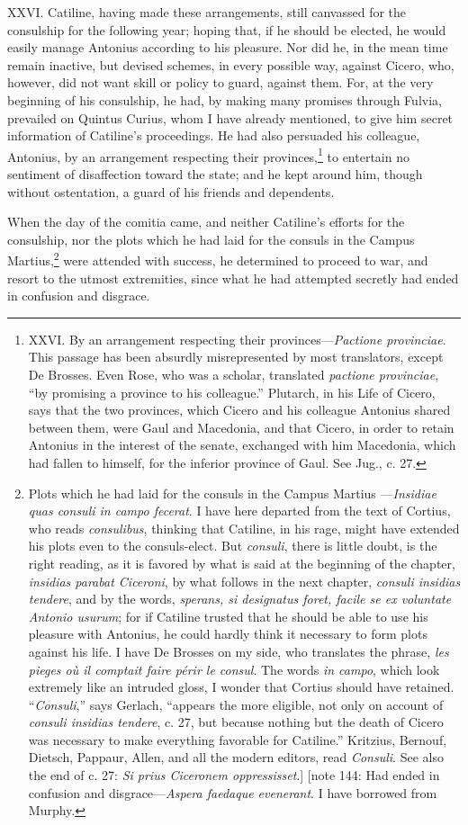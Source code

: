 XXVI. Catiline, having made these arrangements, still canvassed for
the consulship for the following year; hoping that, if he should be
elected, he would easily manage Antonius according to his pleasure.
Nor did he, in the mean time remain inactive, but devised schemes, in
every possible way, against Cicero, who, however, did not want skill
or policy to guard, against them. For, at the very beginning of his
consulship, he had, by making many promises through Fulvia, prevailed
on Quintus Curius, whom I have already mentioned, to give him secret
information of Catiline's proceedings. He had also persuaded his
colleague, Antonius, by an arrangement respecting their provinces,\footnote{XXVI. By an arrangement respecting their provinces—\emph{Pactione
provinciae}. This passage has been absurdly misrepresented by most
translators, except De Brosses. Even Rose, who was a scholar, translated
\emph{pactione provinciae}, ``by promising a province to his colleague.''
Plutarch, in his Life of Cicero, says that the two provinces, which
Cicero and his colleague Antonius shared between them, were Gaul and
Macedonia, and that Cicero, in order to retain Antonius in the interest
of the senate, exchanged with him Macedonia, which had fallen to himself,
for the inferior province of Gaul. See Jug., c. 27.}
to entertain no sentiment of disaffection toward the state; and he kept
around him, though without ostentation, a guard of his friends and
dependents.

When the day of the comitia came, and neither Catiline's efforts for
the consulship, nor the plots which he had laid for the consuls in the
Campus Martius,\footnote{Plots which he had laid for the consuls in the Campus Martius
—\emph{Insidiae quas consuli in campo fecerat}. I have here departed from
the text of Cortius, who reads \emph{consulibus}, thinking that Catiline, in
his rage, might have extended his plots even to the consuls-elect. But
\emph{consuli}, there is little doubt, is the right reading, as it is favored
by what is said at the beginning of the chapter, \emph{insidias parabat
Ciceroni}, by what follows in the next chapter, \emph{consuli insidias tendere},
and by the words, \emph{sperans, si designatus foret, facile se ex voluntate
Antonio usurum}; for if Catiline trusted that he should be able to use
his pleasure with Antonius, he could hardly think it necessary to form
plots against his life. I have De Brosses on my side, who translates the
phrase, \emph{les pieges où il comptait faire périr le consul}. The words \emph{in
campo}, which look extremely like an intruded gloss, I wonder that
Cortius should have retained. ``\emph{Consuli},'' says Gerlach, ``appears the
more eligible, not only on account of \emph{consuli insidias tendere}, c. 27,
but because nothing but the death of Cicero was necessary to make
everything favorable for Catiline.'' Kritzius, Bernouf, Dietsch, Pappaur,
Allen, and all the modern editors, read \emph{Consuli}. See also the end of
c. 27: \emph{Si prius Ciceronem oppressisset}.] [note 144: Had ended in
confusion and disgrace—\emph{Aspera faedaque evenerant}. I have borrowed
from Murphy.} were attended with success, he determined to
proceed to war, and resort to the utmost extremities, since what he
had attempted secretly had ended in confusion and disgrace.

